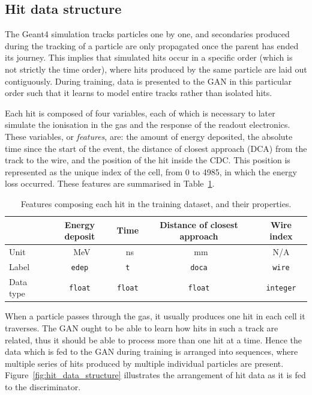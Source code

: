 \subsection{Hit data structure}
\label{sec:hit_data_structure}

The {\sc Geant4} simulation tracks particles one by one, and secondaries produced during the tracking of a particle are only propagated once the parent has ended its journey. This implies that simulated hits occur in a specific order (which is not strictly the time order), where hits produced by the same particle are laid out contiguously. During training, data is presented to the GAN in this particular order such that it learns to model entire tracks rather than isolated hits.

Each hit is composed of four variables, each of which is necessary to later simulate the ionisation in the gas and the response of the readout electronics. These variables, or \emph{features}, are: the amount of energy deposited, the absolute time since the start of the event, the distance of closest approach (DCA) from the track to the wire, and the position of the hit inside the CDC. This position is represented as the unique index of the cell, from 0 to 4985, in which the energy loss occurred. These features are summarised in Table~\ref{tab:gan_features}.

\begin{table}
    \setlength{\tabcolsep}{12pt}
    \centering
    \begin{tabular}{l|cccc}
        \toprule
        & \bfseries Energy deposit & \bfseries Time & \bfseries Distance of closest approach & \bfseries Wire index  \\
        \midrule
        Unit & \SI{}{\MeV} & \SI{}{\ns} & \SI{}{\mm} & N/A \\
        Label & \texttt{edep} & \texttt{t} & \texttt{doca} & \texttt{wire} \\
        Data type & \texttt{float} & \texttt{float} & \texttt{float} & \texttt{integer}
        \\\bottomrule
    \end{tabular}
    \caption{Features composing each hit in the training dataset, and their properties.}
    \label{tab:gan_features}
\end{table}

When a particle passes through the gas, it usually produces one hit in each cell it traverses. The GAN ought to be able to learn how hits in such a track are related, thus it should be able to process more than one hit at a time. Hence the data which is fed to the GAN during training is arranged into sequences, where multiple series of hits produced by multiple individual particles are present. Figure~\ref{fig:hit_data_structure} illustrates the arrangement of hit data as it is fed to the discriminator. 

